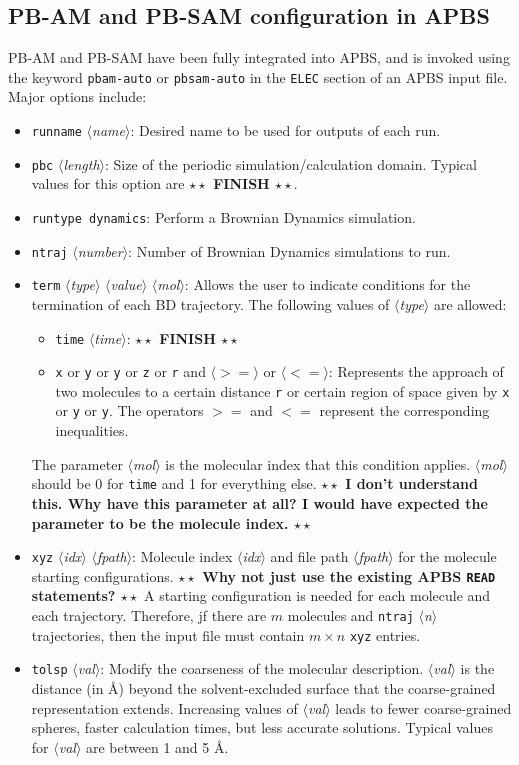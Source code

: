 \documentclass[12pt,titlepage]{article}
\newcommand{\todo}[1]{\textbf{$\star \star$ {#1} $\star \star$}}
\newcommand{\keyword}[1]{\texttt{#1}}
\newcommand{\param}[1]{$\langle$\textit{#1}$\rangle$}
\begin{document}
\subsection{PB-AM and PB-SAM configuration in APBS}
PB-AM and PB-SAM have been fully integrated into APBS, and is invoked using the keyword \keyword{pbam-auto} or \keyword{pbsam-auto} in the \keyword{ELEC} section of an APBS input file.
Major options include:
\begin{itemize}
	\item \keyword{runname} \param{name}: Desired name to be used for outputs of each run.
	\item \keyword{pbc} \param{length}:  Size of the periodic simulation/calculation domain.
	Typical values for this option are \todo{FINISH}.
	\item \keyword{runtype dynamics}:  Perform a Brownian Dynamics simulation.
	\item \keyword{ntraj} \param{number}:  Number of Brownian Dynamics simulations to run. 
	\item \keyword{term} \param{type} \param{value} \param{mol}:  Allows the user to indicate conditions for the termination of each BD trajectory.
	The following values of \param{type} are allowed:
	\begin{itemize}
		\item \keyword{time} \param{time}: \todo{FINISH}
		\item \keyword{x} or \keyword{y} or \keyword{y} or \keyword{z} or \keyword{r} and \param{$>=$} or \param{$<=$}: Represents the approach of two molecules to a certain distance \keyword{r} or certain region of space given by \keyword{x} or \keyword{y} or \keyword{y}.
		The operators $>=$ and $<=$ represent the corresponding inequalities.
	\end{itemize}
	The parameter \param{mol} is the molecular index that this condition applies.  \param{mol} should be 0 for \keyword{time} and 1 for everything else.
	\todo{I don't understand this. Why have this parameter at all?  I would have expected the parameter to be the molecule index.}
	\item \keyword{xyz} \param{idx} \param{fpath}:  Molecule index \param{idx} and file path \param{fpath} for the molecule starting configurations. \todo{Why not just use the existing APBS \keyword{READ} statements?}
	A starting configuration is needed for each molecule and each trajectory.
	Therefore, jf there are $m$ molecules and \keyword{ntraj} \param{n} trajectories, then the input file must contain $m \times n$ \keyword{xyz} entries.
	\item \keyword{tolsp} \param{val}: Modify the coarseness of the molecular description.
	\param{val} is the distance (in \AA) beyond the solvent-excluded surface that the coarse-grained representation extends.
	Increasing values of \param{val} leads to fewer coarse-grained spheres, faster calculation times, but less accurate solutions.
	Typical values for \param{val} are between 1 and 5 \AA.
\end{itemize}
\end{document}
